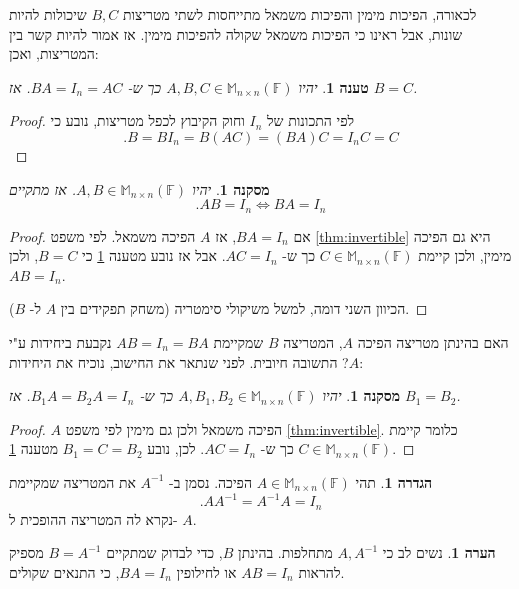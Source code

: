 \documentclass[12pt]{report}
\theoremstyle{plain}
\newtheorem{proposition}[theorem]{טענה}
\newtheorem{corollary}[theorem]{מסקנה}
\theoremstyle{definition}
\newtheorem{definition}[theorem]{הגדרה}
\newtheorem{remark}{הערה}[chapter]
\newcommand{\F}{\mathbb{F}}
\newcommand{\M}{\mathbb{M}}
\newcommand{\0}{\mathbf{0}}
\begin{document}
לכאורה, הפיכות מימין והפיכות משמאל מתייחסות לשתי מטריצות
$B,C$
שיכולות להיות שונות, אבל ראינו כי הפיכות משמאל שקולה להפיכות מימין. אז אמור להיות קשר בין המטריצות, ואכן:

\begin{proposition}\label{prop:inverses}
יהיו 
$A,B,C\in\M_{n\times n}(\F)$ 
כך ש-
$BA=I_n=AC$.
אז
$B=C$.
\end{proposition}

\begin{proof}
לפי התכונות של 
$I_n$
וחוק הקיבוץ לכפל מטריצות,
נובע כי
$$
.B=BI_n=B(AC)=(BA)C=I_nC=C
$$
\end{proof}

\begin{corollary}
יהיו 
$A,B\in\M_{n\times n}(\F)$.
אז מתקיים
$$
.AB=I_n \iff BA=I_n
$$
\end{corollary}

\begin{proof}
אם
$BA=I_n$,
אז 
$A$
הפיכה משמאל. לפי משפט
\ref{thm:invertible}
היא גם הפיכה מימין, ולכן קיימת
$C\in\M_{n\times n}(\F)$
כך ש-
$AC=I_n$.
אבל אז נובע מטענה
\ref{prop:inverses}
כי
$B=C$,
ולכן
$AB=I_n$.

הכיוון השני דומה, למשל משיקולי סימטריה (משחק תפקידים בין
$A$
ל-
$B$).
\end{proof}

האם בהינתן מטריצה הפיכה
$A$,
המטריצה
$B$
שמקיימת
$AB=I_n=BA$
נקבעת ביחידות ע"י
$A$? 
התשובה חיובית.
לפני שנתאר את החישוב, נוכיח את היחידות:

\begin{corollary}
יהיו
$A,B_1,B_2\in\M_{n\times n}(\F)$
כך ש-
$B_1A=B_2A=I_n$.
אז 
$B_1=B_2$.
\end{corollary}

\begin{proof}
$A$
הפיכה משמאל ולכן גם מימין לפי משפט
\ref{thm:invertible}.
כלומר קיימת
$C\in\M_{n\times n}(\F)$
כך ש-
$AC=I_n$.
לכן, נובע
$B_1=C=B_2$
מטענה
\ref{prop:inverses}.
\end{proof}

\begin{definition}
תהי
$A\in\M_{n\times n}(\F)$
הפיכה. נסמן ב-
$A^{-1}$
את המטריצה שמקיימת
$$
.AA^{-1}=A^{-1}A=I_n
$$
נקרא לה המטריצה ההופכית ל-
$A$.
\end{definition}

\begin{remark}
נשים לב כי 
$A,A^{-1}$
מתחלפות. בהינתן 
$B$,
כדי לבדוק שמתקיים
$B=A^{-1}$
מספיק להראות
$AB=I_n$
או לחילופין
$BA=I_n$,
כי התנאים שקולים.
\end{remark}
\end{document}
